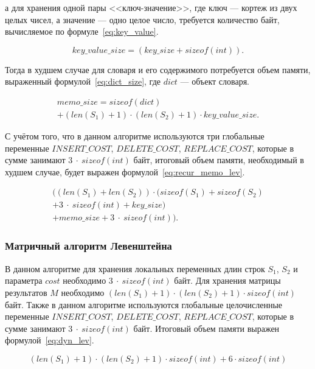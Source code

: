 а для хранения одной пары <<ключ-значение>>, где ключ --- кортеж из двух целых чисел, а значение --- одно целое число, требуется количество байт, вычисляемое по формуле~\ref{eq:key_value}.

\begin{equation}
    \label{eq:key_value}
    key\_value\_size = (key\_size + sizeof(int)).
\end{equation}

Тогда в худшем случае для словаря и его содержимого потребуется объем памяти, выраженный формулой~\ref{eq:dict_size}, где $dict$ --- объект словаря.

\begin{multline}
    \label{eq:dict_size}
    memo\_size = sizeof(dict) \\
    + (len(S_1) + 1) \cdot (len(S_2) + 1) \cdot key\_value\_size.
\end{multline}

С учётом того, что в данном алгоритме используются три глобальные переменные $INSERT\_COST$, $DELETE\_COST$, $REPLACE\_COST$, которые в сумме занимают $3~\cdot~sizeof(int)$ байт, итоговый объем памяти, необходимый в худшем случае, будет выражен формулой~\ref{eq:recur_memo_lev}.

\begin{multline}
    \label{eq:recur_memo_lev}
    ((len(S_1) + len(S_2)) \cdot (sizeof(S_1) + sizeof(S_2) \\
    + 3~\cdot~sizeof(int) + key\_size) \\
    + memo\_size + 3~\cdot~sizeof(int)).
\end{multline}

\subsubsection{Матричный алгоритм Левенштейна}

В данном алгоритме для хранения локальных переменных длин строк $S_1$, $S_2$ и параметра $cost$ необходимо $3~\cdot~sizeof(int)$ байт. Для хранения матрицы результатов $M$ необходимо $(len(S_1) + 1) \cdot (len(S_2) + 1) \cdot sizeof(int)$ байт. Также в данном алгоритме используются глобальные целочисленные переменные $INSERT\_COST$, $DELETE\_COST$, $REPLACE\_COST$, которые в сумме занимают $3~\cdot~sizeof(int)$ байт. Итоговый объем памяти выражен формулой~\ref{eq:dyn_lev}.

\begin{equation}
    \label{eq:dyn_lev}
    (len(S_1) + 1) \cdot (len(S_2) + 1) \cdot sizeof(int) + 6 \cdot sizeof(int)
\end{equation}

